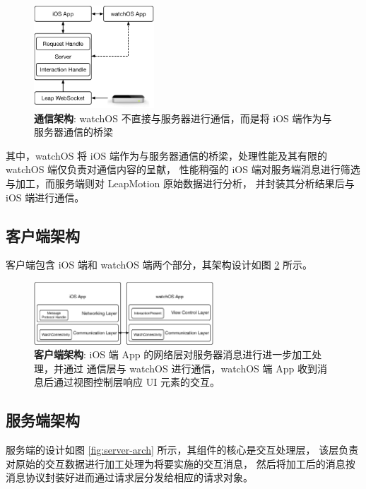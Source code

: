 \begin{figure}[H]
    \kaishu
    \centering
    \includegraphics[width=0.4\textwidth]{figures/arch}
    \caption{\kaishu \textbf{通信架构}: watchOS 不直接与服务器进行通信，而是将 iOS 端作为与服务器通信的桥梁}
    \label{fig:im-arch}
\end{figure}

其中，watchOS 将 iOS 端作为与服务器通信的桥梁，处理性能及其有限的 watchOS 端仅负责对通信内容的呈献，
性能稍强的 iOS 端对服务端消息进行筛选与加工，而服务端则对 LeapMotion 原始数据进行分析，
并封装其分析结果后与 iOS 端进行通信。

\subsection{客户端架构}

客户端包含 iOS 端和 watchOS 端两个部分，其架构设计如图 \ref{fig:client-arch} 所示。

\begin{figure}[H]
    \kaishu
    \centering
    \includegraphics[width=0.6\textwidth]{figures/client-arch}
    \caption{\kaishu \textbf{客户端架构}: iOS 端 App 的网络层对服务器消息进行进一步加工处理，并通过 通信层与 watchOS 进行通信，watchOS 端 App 收到消息后通过视图控制层响应 UI 元素的交互。}
    \label{fig:client-arch}
\end{figure}

\subsection{服务端架构}

服务端的设计如图 \ref{fig:server-arch} 所示，其组件的核心是交互处理层，
该层负责对原始的交互数据进行加工处理为将要实施的交互消息，
然后将加工后的消息按消息协议封装好进而通过请求层分发给相应的请求对象。

